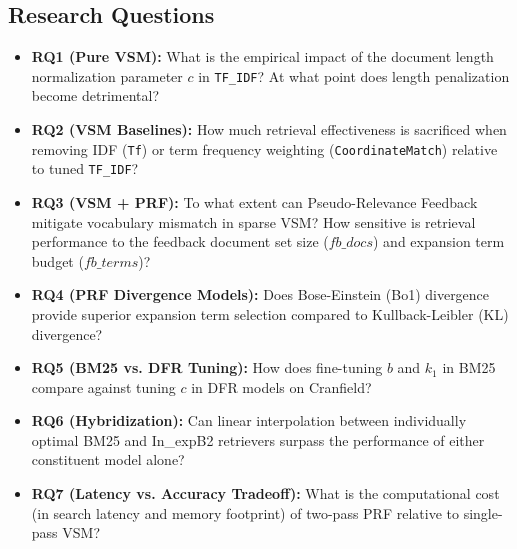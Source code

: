 \documentclass[10pt, a4paper]{article}
\begin{document}
\subsection{Research Questions}
\begin{itemize}[noitemsep,topsep=2pt]
    \item \textbf{RQ1 (Pure VSM):} What is the empirical impact of the document length normalization parameter $c$ in \texttt{TF\_IDF}? At what point does length penalization become detrimental?
    \item \textbf{RQ2 (VSM Baselines):} How much retrieval effectiveness is sacrificed when removing IDF (\texttt{Tf}) or term frequency weighting (\texttt{CoordinateMatch}) relative to tuned \texttt{TF\_IDF}?
    \item \textbf{RQ3 (VSM + PRF):} To what extent can Pseudo-Relevance Feedback mitigate vocabulary mismatch in sparse VSM? How sensitive is retrieval performance to the feedback document set size ($fb\_docs$) and expansion term budget ($fb\_terms$)?
    \item \textbf{RQ4 (PRF Divergence Models):} Does Bose-Einstein (Bo1) divergence provide superior expansion term selection compared to Kullback-Leibler (KL) divergence?
    \item \textbf{RQ5 (BM25 vs. DFR Tuning):} How does fine-tuning $b$ and $k_1$ in BM25 compare against tuning $c$ in DFR models on Cranfield?
    \item \textbf{RQ6 (Hybridization):} Can linear interpolation between individually optimal BM25 and In\_expB2 retrievers surpass the performance of either constituent model alone?
    \item \textbf{RQ7 (Latency vs. Accuracy Tradeoff):} What is the computational cost (in search latency and memory footprint) of two-pass PRF relative to single-pass VSM?
\end{itemize}
\end{document}
